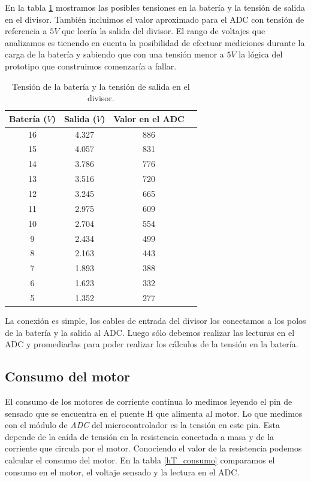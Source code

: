 En la tabla \ref{hT_bateria_divT} mostramos las posibles tensiones en la bater\'ia y la tensi\'on de salida en el divisor.
Tambi\'en incluimos el valor aproximado para el ADC con tensi\'on de referencia a $5V$ que leer\'ia la salida del divisor.
El rango de voltajes que analizamos es tienendo en cuenta la posibilidad de efectuar mediciones durante la carga de la bater\'ia
y sabiendo que con una tensi\'on menor a $5 V$ la l\'ogica del prototipo que construimos comenzar\'ia a fallar.

\begin{table}[ht]
	\begin{center}
		\begin{tabular}{|c|c|c|c|}
			\hline
			Bater\'ia ($V$) & Salida ($V$) & Valor en el ADC \\
			\hline
			16 & 4.327 & 886 \\
			15 & 4.057 & 831 \\
			14 & 3.786 & 776 \\
			13 & 3.516 & 720 \\
			12 & 3.245 & 665 \\
			11 & 2.975 & 609 \\
			10 & 2.704 & 554 \\
			 9 & 2.434 & 499 \\
			 8 & 2.163 & 443 \\
			 7 & 1.893 & 388 \\
			 6 & 1.623 & 332 \\
			 5 & 1.352 & 277 \\
			\hline
		\end{tabular}
	\end{center}
	\caption{Tensi\'on de la bater\'ia y la tensi\'on de salida en el divisor.}
	\label{hT_bateria_divT}
\end{table}

La conexi\'on es simple, los cables de entrada del divisor los conectamos a los polos de la bater\'ia y la salida al ADC.
Luego s\'olo debemos realizar las lecturas en el ADC y promediarlas para poder realizar los c\'alculos de la tensi\'on en la bater\'ia.

\subsection{Consumo del motor}
\label{h_sensado_consumo}

El consumo de los motores de corriente cont\'inua lo medimos leyendo el pin de sensado que se encuentra en el puente H que alimenta al motor.
Lo que medimos con el m\'odulo de \emph{ADC} del microcontrolador es la tensi\'on en este pin.
Esta depende de la ca\'ida de tensi\'on en la resistencia conectada a masa y de la corriente que circula por el motor.
Conociendo el valor de la resistencia podemos calcular el consumo del motor.
En la tabla \ref{hT_consumo} comparamos el consumo en el motor, el voltaje sensado y la lectura en el ADC.


